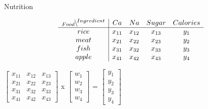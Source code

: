 \documentclass{article}
\begin{document}
\begin{center}
   \begin{table}
    \caption{Nutrition}
    \[\begin{array}{c|ccccc}
    {}_{Food}\mkern-6mu\setminus\mkern-6mu{}^{Ingredient} & Ca & Na & Sugar & Calories \\
    \hline
    rice & x_{11} & x_{12} & x_{13} & y_1 \\
    meat & x_{21} & x_{22} & x_{23} & y_2 \\
    fish & x_{31} & x_{32} & x_{33} & y_3 \\
    apple & x_{41} & x_{42} & x_{43} & y_4 \\
    \end{array}\]
    \end{table}

    $\begin{bmatrix}
        x_{11} & x_{12} & x_{13} \\
        x_{21} & x_{22} & x_{23} \\ 
        x_{31} & x_{32} & x_{33} \\
        x_{41} & x_{42} & x_{43}
    \end{bmatrix}$
    x 
    $\begin{bmatrix}
        w_1 \\ 
        w_2 \\
        w_3 \\ 
        w_4
    \end{bmatrix}$
    = 
    $\begin{bmatrix}
        y_1 \\ 
        y_2 \\
        y_3 \\ 
        y_4
    \end{bmatrix}$

\end{center}
\end{document}
